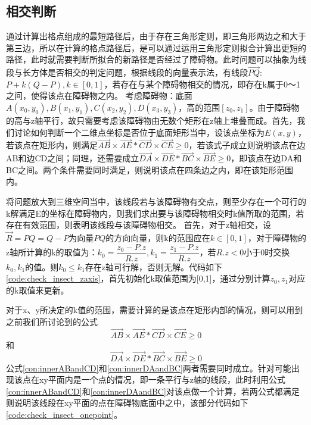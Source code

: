 \subsection{相交判断}
\par 通过计算出格点组成的最短路径后，由于存在三角形定则，即三角形两边之和大于第三边，所以在计算的格点路径后，是可以通过运用三角形定则拟合计算出更短的路径，此时就需要判断所拟合的新路径是否经过了障碍物。此时问题可以抽象为线段与长方体是否相交的判定问题，根据线段的向量表示法，有线段$\vec{PQ}$:$P+k(Q-P),k\in [0,1]$，若存在与某个障碍物相交的情况，即存在k属于0～1之间，使得该点在障碍物之内。
考虑障碍物：底面$A(x_0,y_0),B(x_1,y_1),C(x_2,y_2),D(x_3,y_3)$，高的范围$[z_0,z_1]$。由于障碍物的高与z轴平行，故只需要考虑该障碍物由无数个矩形在z轴上堆叠而成。首先，我们讨论如何判断一个二维点坐标是否位于底面矩形当中，设该点坐标为$E(x,y)$，若该点在矩形内，则满足$\vec{AB}\times\vec{AE}*\vec{CD}\times\vec{CE}\ge 0$，若该式子成立则说明该点在边AB和边CD之间；同理，还需要成立$\vec{DA}\times\vec{DE}*\vec{BC}\times\vec{BE}\ge 0$，即该点在边DA和BC之间。两个条件需要同时满足，则说明该点在四条边之内，即在该矩形范围内。
\par 将问题放大到三维空间当中，该线段若与该障碍物有交点，则至少存在一个可行的k解满足E的坐标在障碍物内，则我们求出要与该障碍物相交时k值所取的范围，若存在有效范围，则表明该线段与该障碍物相交。
首先，对于z轴相交，设$\vec{R}=PQ=Q-P$为向量$PQ$的方向向量，则k的范围应在$k\in [0,1]$，对于障碍物的z轴所计算的k的取值为：$k_0=\dfrac{z_0-P.z}{R.z},k_1=\dfrac{z_1-P.z}{R.z}$，若$R.z<0$小于0时交换$k_0,k_1$的值。则$k_0\leq k_1$存在z轴可行解，否则无解。代码如下\ref{code:check_insect_zaxis}，首先初始化k取值范围为[0,1]，通过分别计算$z_0,z_1$对应的k取值来更新。

对于x、y所决定的k值的范围，需要计算的是该点在矩形内部的情况，则可以用到之前我们所讨论到的公式
\begin{equation}
    \vec{AB}\times\vec{AE}*\vec{CD}\times\vec{CE}\ge 0
\label{con:innerABandCD}
\end{equation}
和
\begin{equation}
    \vec{DA}\times\vec{DE}*\vec{BC}\times\vec{BE}\ge 0
\label{con:innerDAandBC}
\end{equation}
公式\ref{con:innerABandCD}和\ref{con:innerDAandBC}两者需要同时成立。针对可能出现该点在xy平面内是一个点的情况，即一条平行与z轴的线段，此时利用公式\ref{con:innerABandCD}和\ref{con:innerDAandBC}对该点做一个计算，若两公式都满足则说明该线段在xy平面的点在障碍物底面中之中，该部分代码如下\ref{code:check_insect_onepoint}。

